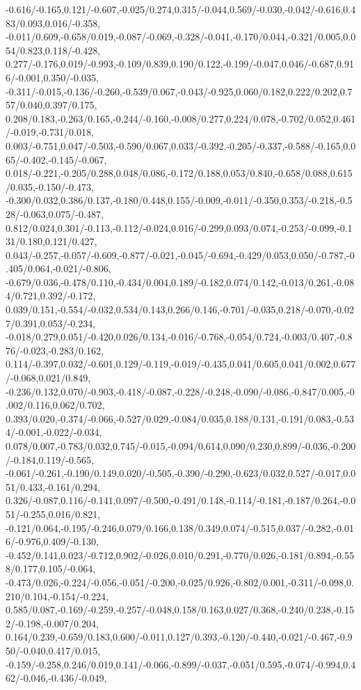 {-0.616/-0.165,0.121/-0.607,-0.025/0.274,0.315/-0.044,0.569/-0.030,-0.042/-0.616,0.483/0.093,0.016/-0.358,%
-0.011/0.609,-0.658/0.019,-0.087/-0.069,-0.328/-0.041,-0.170/0.044,-0.321/0.005,0.054/0.823,0.118/-0.428,%
0.277/-0.176,0.019/-0.993,-0.109/0.839,0.190/0.122,-0.199/-0.047,0.046/-0.687,0.916/-0.001,0.350/-0.035,%
-0.311/-0.015,-0.136/-0.260,-0.539/0.067,-0.043/-0.925,0.060/0.182,0.222/0.202,0.757/0.040,0.397/0.175,%
0.208/0.183,-0.263/0.165,-0.244/-0.160,-0.008/0.277,0.224/0.078,-0.702/0.052,0.461/-0.019,-0.731/0.018,%
0.003/-0.751,0.047/-0.503,-0.590/0.067,0.033/-0.392,-0.205/-0.337,-0.588/-0.165,0.065/-0.402,-0.145/-0.067,%
0.018/-0.221,-0.205/0.288,0.048/0.086,-0.172/0.188,0.053/0.840,-0.658/0.088,0.615/0.035,-0.150/-0.473,%
-0.300/0.032,0.386/0.137,-0.180/0.448,0.155/-0.009,-0.011/-0.350,0.353/-0.218,-0.528/-0.063,0.075/-0.487,%
0.812/0.024,0.301/-0.113,-0.112/-0.024,0.016/-0.299,0.093/0.074,-0.253/-0.099,-0.131/0.180,0.121/0.427,%
0.043/-0.257,-0.057/-0.609,-0.877/-0.021,-0.045/-0.694,-0.429/0.053,0.050/-0.787,-0.405/0.064,-0.021/-0.806,%
-0.679/0.036,-0.478/0.110,-0.434/0.004,0.189/-0.182,0.074/0.142,-0.013/0.261,-0.084/0.721,0.392/-0.172,%
0.039/0.151,-0.554/-0.032,0.534/0.143,0.266/0.146,-0.701/-0.035,0.218/-0.070,-0.027/0.391,0.053/-0.234,%
-0.018/0.279,0.051/-0.420,0.026/0.134,-0.016/-0.768,-0.054/0.724,-0.003/0.407,-0.876/-0.023,-0.283/0.162,%
0.114/-0.397,0.032/-0.601,0.129/-0.119,-0.019/-0.435,0.041/0.605,0.041/0.002,0.677/-0.068,0.021/0.849,%
-0.236/0.132,0.070/-0.903,-0.418/-0.087,-0.228/-0.248,-0.090/-0.086,-0.847/0.005,-0.002/0.116,0.062/0.702,%
0.393/0.020,-0.374/-0.066,-0.527/0.029,-0.084/0.035,0.188/0.131,-0.191/0.083,-0.534/-0.001,-0.022/-0.034,%
0.078/0.007,-0.783/0.032,0.745/-0.015,-0.094/0.614,0.090/0.230,0.899/-0.036,-0.200/-0.184,0.119/-0.565,%
-0.061/-0.261,-0.190/0.149,0.020/-0.505,-0.390/-0.290,-0.623/0.032,0.527/-0.017,0.051/0.433,-0.161/0.294,%
0.326/-0.087,0.116/-0.141,0.097/-0.500,-0.491/0.148,-0.114/-0.181,-0.187/0.264,-0.051/-0.255,0.016/0.821,%
-0.121/0.064,-0.195/-0.246,0.079/0.166,0.138/0.349,0.074/-0.515,0.037/-0.282,-0.016/-0.976,0.409/-0.130,%
-0.452/0.141,0.023/-0.712,0.902/-0.026,0.010/0.291,-0.770/0.026,-0.181/0.894,-0.558/0.177,0.105/-0.064,%
-0.473/0.026,-0.224/-0.056,-0.051/-0.200,-0.025/0.926,-0.802/0.001,-0.311/-0.098,0.210/0.104,-0.154/-0.224,%
0.585/0.087,-0.169/-0.259,-0.257/-0.048,0.158/0.163,0.027/0.368,-0.240/0.238,-0.152/-0.198,-0.007/0.204,%
0.164/0.239,-0.659/0.183,0.600/-0.011,0.127/0.393,-0.120/-0.440,-0.021/-0.467,-0.950/-0.040,0.417/0.015,%
-0.159/-0.258,0.246/0.019,0.141/-0.066,-0.899/-0.037,-0.051/0.595,-0.074/-0.994,0.462/-0.046,-0.436/-0.049,%
}
